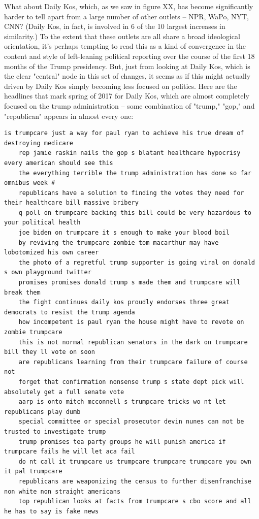 \documentclass{scrartcl}
\begin{document}
What about Daily Kos, which, as we saw in figure XX, has become significantly harder to tell apart from a large number of other outlets -- NPR, WaPo, NYT, CNN? (Daily Kos, in fact, is involved in 6 of the 10 largest increases in similarity.) To the extent that these outlets are all share a broad ideological orientation, it's perhaps tempting to read this as a kind of convergence in the content and style of left-leaning political reporting over the course of the first 18 months of the Trump presidency. But, just from looking at Daily Kos, which is the clear "central" node in this set of changes, it seems as if this might actually driven by Daily Kos simply becoming less focused on politics. Here are the headlines that mark spring of 2017 for Daily Kos, which are almost completely focused on the trump administration -- some combination of "trump," "gop," and "republican" appears in almost every one:

\begin{lstlisting}[basicstyle=\tiny\hlfont]
    is trumpcare just a way for paul ryan to achieve his true dream of destroying medicare
    rep jamie raskin nails the gop s blatant healthcare hypocrisy every american should see this
    the everything terrible the trump administration has done so far omnibus week #
    republicans have a solution to finding the votes they need for their healthcare bill massive bribery
    q poll on trumpcare backing this bill could be very hazardous to your political health
    joe biden on trumpcare it s enough to make your blood boil
    by reviving the trumpcare zombie tom macarthur may have lobotomized his own career
    the photo of a regretful trump supporter is going viral on donald s own playground twitter
    promises promises donald trump s made them and trumpcare will break them
    the fight continues daily kos proudly endorses three great democrats to resist the trump agenda
    how incompetent is paul ryan the house might have to revote on zombie trumpcare
    this is not normal republican senators in the dark on trumpcare bill they ll vote on soon
    are republicans learning from their trumpcare failure of course not
    forget that confirmation nonsense trump s state dept pick will absolutely get a full senate vote
    aarp is onto mitch mcconnell s trumpcare tricks wo nt let republicans play dumb
    special committee or special prosecutor devin nunes can not be trusted to investigate trump
    trump promises tea party groups he will punish america if trumpcare fails he will let aca fail
    do nt call it trumpcare us trumpcare trumpcare trumpcare you own it pal trumpcare
    republicans are weaponizing the census to further disenfranchise non white non straight americans
    top republican looks at facts from trumpcare s cbo score and all he has to say is fake news
\end{lstlisting}
\end{document}
